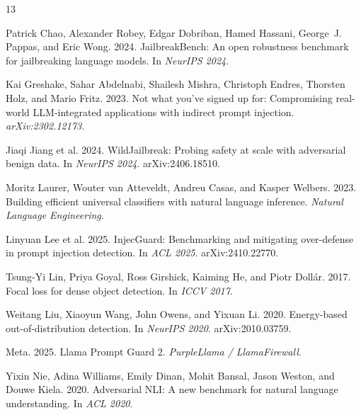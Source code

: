 \documentclass[11pt]{article}
\begin{document}



\begin{thebibliography}{13}

Patrick Chao, Alexander Robey, Edgar Dobriban, Hamed Hassani, George~J. Pappas, and Eric Wong. 2024.
\newblock JailbreakBench: An open robustness benchmark for jailbreaking language models.
\newblock In \emph{NeurIPS 2024}.

Kai Greshake, Sahar Abdelnabi, Shailesh Mishra, Christoph Endres, Thorsten Holz, and Mario Fritz. 2023.
\newblock Not what you've signed up for: Compromising real-world LLM-integrated applications with indirect prompt injection.
\newblock \emph{arXiv:2302.12173}.

Jiaqi Jiang et al. 2024.
\newblock WildJailbreak: Probing safety at scale with adversarial benign data.
\newblock In \emph{NeurIPS 2024}. arXiv:2406.18510.

Moritz Laurer, Wouter van Atteveldt, Andreu Casas, and Kasper Welbers. 2023.
\newblock Building efficient universal classifiers with natural language inference.
\newblock \emph{Natural Language Engineering}.

Linyuan Lee et al. 2025.
\newblock InjecGuard: Benchmarking and mitigating over-defense in prompt injection detection.
\newblock In \emph{ACL 2025}. arXiv:2410.22770.

Tsung-Yi Lin, Priya Goyal, Ross Girshick, Kaiming He, and Piotr Doll{\'a}r. 2017.
\newblock Focal loss for dense object detection.
\newblock In \emph{ICCV 2017}.

Weitang Liu, Xiaoyun Wang, John Owens, and Yixuan Li. 2020.
\newblock Energy-based out-of-distribution detection.
\newblock In \emph{NeurIPS 2020}. arXiv:2010.03759.

Meta. 2025.
\newblock Llama Prompt Guard 2.
\newblock \emph{PurpleLlama / LlamaFirewall}.

Yixin Nie, Adina Williams, Emily Dinan, Mohit Bansal, Jason Weston, and Douwe Kiela. 2020.
\newblock Adversarial NLI: A new benchmark for natural language understanding.
\newblock In \emph{ACL 2020}.


\end{thebibliography}
\end{document}
